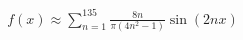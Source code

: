 \documentclass[preview]{standalone}
\begin{document}
\begin{align*}
f(x) \approx \sum_{n=1}^{135} \frac{8n}{\pi(4n^2-1)} \sin(2nx)
\end{align*}
\end{document}

